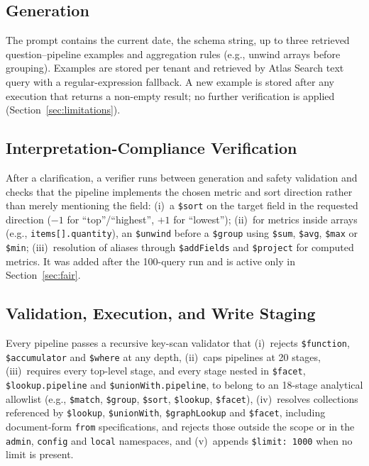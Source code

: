 \subsection{Generation}
The prompt contains the current date, the schema string, up to three retrieved question--pipeline examples and aggregation rules (e.g., unwind arrays before grouping). Examples are stored per tenant and retrieved by Atlas Search text query with a regular-expression fallback. A new example is stored after any execution that returns a non-empty result; no further verification is applied (Section~\ref{sec:limitations}).

\subsection{Interpretation-Compliance Verification}
After a clarification, a verifier runs between generation and safety validation and checks that the pipeline implements the chosen metric and sort direction rather than merely mentioning the field: (i)~a \texttt{\$sort} on the target field in the requested direction ($-1$ for ``top''/``highest'', $+1$ for ``lowest''); (ii)~for metrics inside arrays (e.g., \texttt{items[].quantity}), an \texttt{\$unwind} before a \texttt{\$group} using \texttt{\$sum}, \texttt{\$avg}, \texttt{\$max} or \texttt{\$min}; (iii)~resolution of aliases through \texttt{\$addFields} and \texttt{\$project} for computed metrics. It was added after the 100-query run and is active only in Section~\ref{sec:fair}.

\subsection{Validation, Execution, and Write Staging}
Every pipeline passes a recursive key-scan validator that (i)~rejects \texttt{\$function}, \texttt{\$accumulator} and \texttt{\$where} at any depth, (ii)~caps pipelines at 20 stages, (iii)~requires every top-level stage, and every stage nested in \texttt{\$facet}, \texttt{\$lookup.pipeline} and \texttt{\$unionWith.pipeline}, to belong to an 18-stage analytical allowlist (e.g., \texttt{\$match}, \texttt{\$group}, \texttt{\$sort}, \texttt{\$lookup}, \texttt{\$facet}), (iv)~resolves collections referenced by \texttt{\$lookup}, \texttt{\$unionWith}, \texttt{\$graphLookup} and \texttt{\$facet}, including document-form \texttt{from} specifications, and rejects those outside the scope or in the \texttt{admin}, \texttt{config} and \texttt{local} namespaces, and (v)~appends \texttt{\$limit: 1000} when no limit is present.

